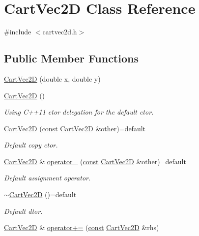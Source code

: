 \hypertarget{class_cart_vec2_d}{}\section{Cart\+Vec2D Class Reference}
\label{class_cart_vec2_d}


{\ttfamily \#include $<$cartvec2d.\+h$>$}

\subsection*{Public Member Functions}
\begin{DoxyCompactItemize}
\item 
\hyperlink{class_cart_vec2_d_a331773f726723eafc4ddbaff10195946}{Cart\+Vec2D} (double x, double y)
\item 
\hyperlink{class_cart_vec2_d_a3096b2d8c025290a5e30633000bbb315}{Cart\+Vec2D} ()
\begin{DoxyCompactList}\small\item\em Using C++11 ctor delegation for the default ctor. \end{DoxyCompactList}\item 
\hyperlink{class_cart_vec2_d_a4f749e7595a1835b4b9eb5c1e3ddc2ae}{Cart\+Vec2D} (\hyperlink{functions__c_8js_afacfd9c985d225bb07483b887a801b6f}{const} \hyperlink{class_cart_vec2_d}{Cart\+Vec2D} \&other)=default
\begin{DoxyCompactList}\small\item\em Default copy ctor. \end{DoxyCompactList}\item 
\hyperlink{class_cart_vec2_d}{Cart\+Vec2D} \& \hyperlink{class_cart_vec2_d_a103b408052d6d796c0ff71c74d1d4d8f}{operator=} (\hyperlink{functions__c_8js_afacfd9c985d225bb07483b887a801b6f}{const} \hyperlink{class_cart_vec2_d}{Cart\+Vec2D} \&other)=default
\begin{DoxyCompactList}\small\item\em Default assignment operator. \end{DoxyCompactList}\item 
\hyperlink{class_cart_vec2_d_aa0077dfbcf1d52db2c6a4e6b68c12b31}{$\sim$\+Cart\+Vec2D} ()=default
\begin{DoxyCompactList}\small\item\em Default dtor. \end{DoxyCompactList}\item 
\hyperlink{class_cart_vec2_d}{Cart\+Vec2D} \& \hyperlink{class_cart_vec2_d_a534f5059db6628f14d711b0f0f34945c}{operator+=} (\hyperlink{functions__c_8js_afacfd9c985d225bb07483b887a801b6f}{const} \hyperlink{class_cart_vec2_d}{Cart\+Vec2D} \&rhs)

\end{DoxyCompactItemize}
